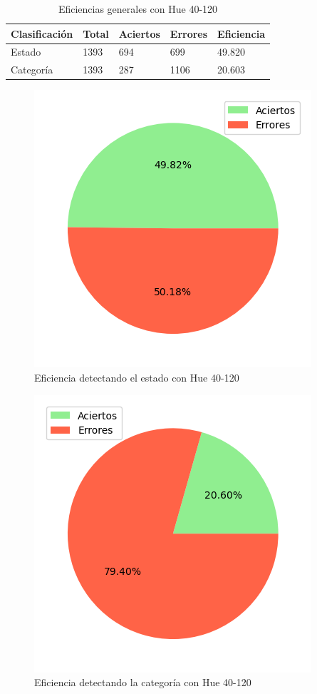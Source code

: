 \begin{table}[H]
\centering
\begin{tabular}{|l|l|l|l|l|}
\hline 
\textbf{Clasificación} & \textbf{Total} & \textbf{Aciertos} & \textbf{Errores} & \textbf{Eficiencia} \\
\hline
Estado & 1393 & 694 & 699 & 49.820 \\
\hline 
Categoría & 1393 & 287 & 1106 & 20.603 \\
\hline 
\end{tabular}
\caption{Eficiencias generales con Hue 40-120}
\label{table:efficiency_general_40_120}
\end{table}

\captionsetup[figure]{skip=-10pt}

\begin{figure}[H]
\centering
\includegraphics[scale=0.6]{images/result_global_state_40_120.png}
\caption{Eficiencia detectando el estado con Hue 40-120}
\label{img:efficiency_state_40_120}
\end{figure}

\begin{figure}[H]
\centering
\includegraphics[scale=0.6]{images/result_global_class_40_120.png}
\caption{Eficiencia detectando la categoría con Hue 40-120}
\label{img:efficiency_category_40_120}
\end{figure}

